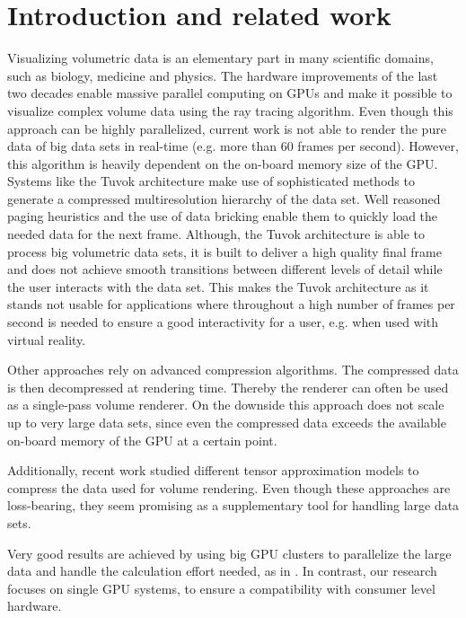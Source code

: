 \documentclass[12pt,conference]{IEEEtran}
\begin{document}
\section{Introduction and related work}
Visualizing volumetric data is an elementary part in many scientific domains, such as biology, medicine and physics. The hardware improvements of the last two decades enable massive parallel computing on GPUs and make it possible to visualize complex volume data using the ray tracing algorithm\cite{purcell2002ray}. Even though this approach can be highly parallelized, current work is not able to render the pure data of big data sets in real-time (e.g. more than 60 frames per second). However, this algorithm is heavily dependent on the on-board memory size of the GPU. Systems like the Tuvok architecture make use of sophisticated methods to generate a compressed multiresolution hierarchy of the data set. Well reasoned paging heuristics and the use of data bricking enable them to quickly load the needed data for the next frame\cite{fogal2010tuvok}. Although, the Tuvok architecture is able to process big volumetric data sets, it is built to deliver a high quality final frame and does not achieve smooth transitions between different levels of detail while the user interacts with the data set. This makes the Tuvok architecture as it stands not usable for applications where throughout a high number of frames per second is needed to ensure a good interactivity for a user, e.g. when used with virtual reality.
\par
Other approaches rely on advanced compression algorithms. The compressed data is then decompressed at rendering time. Thereby the renderer can often be used as a single-pass volume renderer\cite{guthe2002interactive}. On the downside this approach does not scale up to very large data sets, since even the compressed data exceeds the available on-board memory of the GPU at a certain point.
\par
Additionally, recent work studied different tensor approximation models to compress the data used for volume rendering\cite{ballester2015analysis}. Even though these approaches are loss-bearing, they seem promising as a supplementary tool for handling large data sets. 
\par
Very good results are achieved by using big GPU clusters to parallelize the large data and handle the calculation effort needed, as in \cite{nvidia2014index}. In contrast, our research focuses on single GPU systems, to ensure a compatibility with consumer level hardware.
\par
\end{document}
